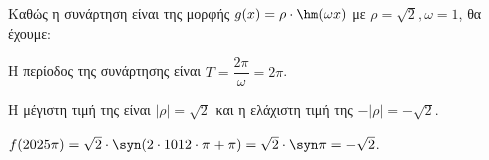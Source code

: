 \begin{alist}
\item Καθώς η συνάρτηση είναι της μορφής $g(x) = \rho \cdot \hm (\omega x)$ με $\rho = \sqrt{2}, \omega = 1$, θα έχουμε:
\begin{rlist}
\item Η περίοδος της συνάρτησης είναι $T = \dfrac{2\pi}{\omega} = 2\pi$.
\item Η μέγιστη τιμή της είναι $|\rho| = \sqrt{2}$ και η ελάχιστη τιμή της $-|\rho| = -\sqrt{2}$.
\end{rlist}
\item $f(2025\pi) = \sqrt{2} \cdot \syn (2 \cdot 1012 \cdot \pi + \pi) = \sqrt{2} \cdot \syn \pi = -\sqrt{2}$.
\end{alist}

